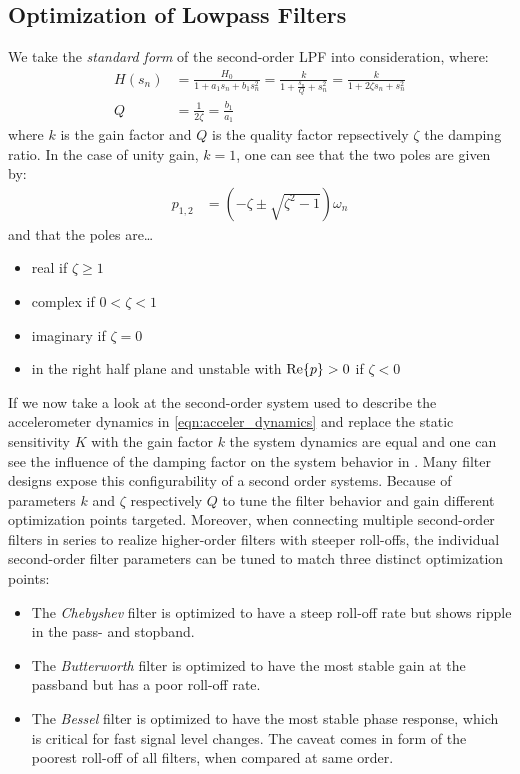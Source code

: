 \subsection{Optimization of Lowpass Filters}
We take the \emph{standard form} of the second-order \ac{LPF} into consideration, where:
\begin{align}
  H(s_n) &= \frac{H_0}{1+a_1s_n+b_1s_n^2} = \frac{k}{\displaystyle 1+\frac{s_n}{Q}+s_n^2} = \frac{k}{1+2\zeta s_n+s_n^2} \\
  Q &= \frac{1}{2\zeta} = \frac{b_1}{a_1}
\end{align}
where $k$ is the gain factor and $Q$ is the quality factor repsectively $\zeta$ the damping ratio. In the case of unity gain, $k=1$, one can see that the two poles are given by:
\begin{align}
  p_{1,2} &= (-\zeta \pm \sqrt{\zeta^2-1})\omega_n
\end{align}
and that the poles are\dots
\begin{itemize}
  \item real if $\zeta\geq 1$
  \item complex if $0<\zeta<1$
  \item imaginary if $\zeta=0$
  \item in the right half plane and unstable with $\mathrm{Re}\Bqty{p}>0$ if $\zeta<0$
\end{itemize}
If we now take a look at the second-order system used to describe the accelerometer dynamics in \eqref{eqn:acceler_dynamics} and replace the static sensitivity $K$ with the gain factor $k$ the system dynamics are equal and one can see the influence of the damping factor on the system behavior in .
Many filter designs expose this configurability of a second order systems. Because of parameters $k$ and $\zeta$ respectively $Q$ to tune the filter behavior and gain different optimization points targeted. Moreover, when connecting multiple second-order filters in series to realize higher-order filters with steeper roll-offs, the individual second-order filter parameters can be tuned to match three distinct optimization points:

\begin{itemize}
  \item The \emph{Chebyshev} filter is optimized to have a steep roll-off rate but shows ripple in the pass- and stopband.
  \item The \emph{Butterworth} filter is optimized to have the most stable gain at the passband but has a poor roll-off rate.
  \item The \emph{Bessel} filter is optimized to have the most stable phase response, which is critical for fast signal level changes. The caveat comes in form of the poorest roll-off of all filters, when compared at same order.
\end{itemize}

